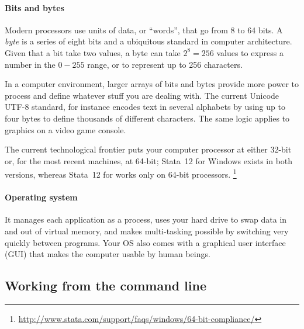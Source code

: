 %
%
\paragraph{Bits and bytes}%

 Modern processors use units of data, or ``words'', that go from 8 to 64 bits. A \emph{byte} is a series of eight bits and a ubiquitous standard in computer architecture. Given that a bit take two values, a byte can take $2^8=256$ values to express a number in the $0-255$ range, or to represent up to 256 characters.%

In a computer environment, larger arrays of bits and bytes provide more power to process and define whatever stuff you are dealing with. The current Unicode UTF-8 standard, for instance encodes text in several alphabets by using up to four bytes to define thousands of different characters. The same logic applies to graphics on a video game console.%

The current technological frontier puts your computer processor at either 32-bit or, for the most recent machines, at 64-bit; Stata~12 for Windows exists in both versions, whereas Stata~12 for \OSX works only on 64-bit processors. %
  \footnote{\url{http://www.stata.com/support/faqs/windows/64-bit-compliance/}}

%
%
\paragraph{Operating system}%

 It manages each application as a process, uses your hard drive to swap data in and out of virtual memory, and makes multi-tasking possible by switching very quickly between programs. Your OS also comes with a graphical user interface (GUI) that makes the computer usable by human beings.%

%
% 
%
\subsection{Working from the command line} %
  \label{sec:cli}

